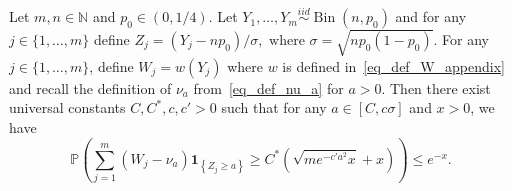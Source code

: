 \documentclass[10pt,a4paper]{amsart}
\newcommand{\one}{\mathbf{1}}
\begin{document}
\begin{lemma}\label{leq_truncchisq_concentration} Let $m,n \in \mathbb N$ and $p_0 \in (0,1/4)$. 
Let $Y_1,\dots, Y_m \overset{iid}{\sim} \operatorname{Bin}(n,p_0)$ and for any $j \in \{1,\dots,m\}$ define 
$Z_j = (Y_j-np_0)/\sigma, \text{ where } \sigma = \sqrt{np_0(1-p_0)}.$ 
For any $j \in \{1,\dots,m\}$, define $W_j = w(Y_j)$ where $w$ is defined in~\eqref{eq_def_W_appendix} and recall the definition of $\nu_a$ from~\eqref{eq_def_nu_a} for $a > 0$. 
Then there exist universal constants $C,C^{*}, c, c'>0$ such that for any $a\in [C,c\sigma]$ and $x>0$, we have
$$
\mathbb{P}\left(\sum_{j=1}^{m}\left(W_j-\nu_{a}\right) \one_{\left\{Z_{j} \geq a\right\}} \geq C^{*}\left(\sqrt{m e^{-c'a^2} x}+x\right)\right) \leq e^{-x}.
$$
\end{lemma}
\end{document}
